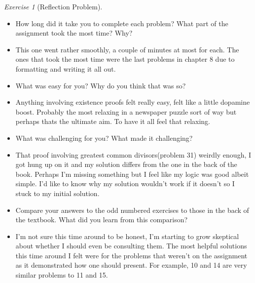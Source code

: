 \documentclass[12pt]{amsart}
\makeatletter
\theoremstyle{remark}
\newtheorem*{exercise}{Exercise}%
\renewenvironment{proof}[1][\proofname]{\par\doublespacing
  \pushQED{\qed}%
  \normalfont \topsep6\p@\@plus6\p@\relax
  \list{}{%
    \settowidth{\leftmargin}{\itshape\proofname:\hskip\labelsep}%
    \setlength{\labelwidth}{0pt}%
    \setlength{\itemindent}{-\leftmargin}%
  }%
  \item[\hskip\labelsep\itshape#1\@addpunct{:}]\ignorespaces
}{%
  \popQED\endlist\@endpefalse
  \singlespacing
}
\theoremstyle{mycomment}
\makeatother
\begin{document}
\begin{exercise}[Reflection Problem]

\begin{itemize}
\item How long did it take you to complete each problem? What part of the assignment took the most time? Why?
\begin{proof}[Response]
This one went rather smoothly, a couple of minutes at most for each. The ones that took the most time were the last problems in chapter 8 due to formatting and writing it all out.
\end{proof}
\item What was easy for you? Why do you think that was so?
\begin{proof}[Response]
Anything involving existence proofs felt really easy, felt like a little dopamine boost. Probably the most relaxing in a newspaper puzzle sort of way but perhaps thats the ultimate aim. To have it all feel that relaxing.
\end{proof}
\item What was challenging for you? What made it challenging?
\begin{proof}[Response]
That proof involving greatest common divisors(problem 31) weirdly enough, I got hung up on it and my solution differs from the one in the back of the book. Perhaps I'm missing something but I feel like my logic was good albeit simple. I'd like to know why my solution wouldn't work if it doesn't so I stuck to my initial solution. 
\end{proof}
\item Compare your answers to the odd numbered exercises to those in the back of the textbook. What did you learn from this comparison?
\begin{proof}[Response]
I'm not sure this time around to be honest, I'm starting to grow skeptical about whether I should even be consulting them. The most helpful solutions this time around I felt were for the problems that weren't on the assignment as it demonstrated how one should present. For example, 10 and 14 are very similar problems to 11 and 15.
\end{proof}
\end{itemize}

\end{exercise}













 
\end{document}
